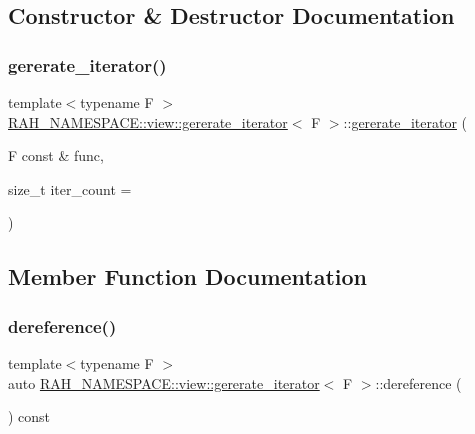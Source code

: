 \subsection{Constructor \& Destructor Documentation}
\mbox{\label{struct_r_a_h___n_a_m_e_s_p_a_c_e_1_1view_1_1gererate__iterator_ac3dfab3685227633f4f80802e5c81e8e}} 
\subsubsection{\texorpdfstring{gererate\_iterator()}{gererate\_iterator()}}
{\footnotesize\ttfamily template$<$typename F $>$ \\
\mbox{\hyperlink{struct_r_a_h___n_a_m_e_s_p_a_c_e_1_1view_1_1gererate__iterator}{R\+A\+H\+\_\+\+N\+A\+M\+E\+S\+P\+A\+C\+E\+::view\+::gererate\+\_\+iterator}}$<$ F $>$\+::\mbox{\hyperlink{struct_r_a_h___n_a_m_e_s_p_a_c_e_1_1view_1_1gererate__iterator}{gererate\+\_\+iterator}} (\begin{DoxyParamCaption}\item[{F const \&}]{func,  }\item[{size\+\_\+t}]{iter\+\_\+count = {} }\end{DoxyParamCaption})\hspace{0.3cm}{\ttfamily [inline]}}



\subsection{Member Function Documentation}
\mbox{\label{struct_r_a_h___n_a_m_e_s_p_a_c_e_1_1view_1_1gererate__iterator_ad68f1e87c422d156a4f8273fec7d51d4}} 
\subsubsection{\texorpdfstring{dereference()}{dereference()}}
{\footnotesize\ttfamily template$<$typename F $>$ \\
auto \mbox{\hyperlink{struct_r_a_h___n_a_m_e_s_p_a_c_e_1_1view_1_1gererate__iterator}{R\+A\+H\+\_\+\+N\+A\+M\+E\+S\+P\+A\+C\+E\+::view\+::gererate\+\_\+iterator}}$<$ F $>$\+::dereference (\begin{DoxyParamCaption}{ }\end{DoxyParamCaption}) const\hspace{0.3cm}{\ttfamily [inline]}}

